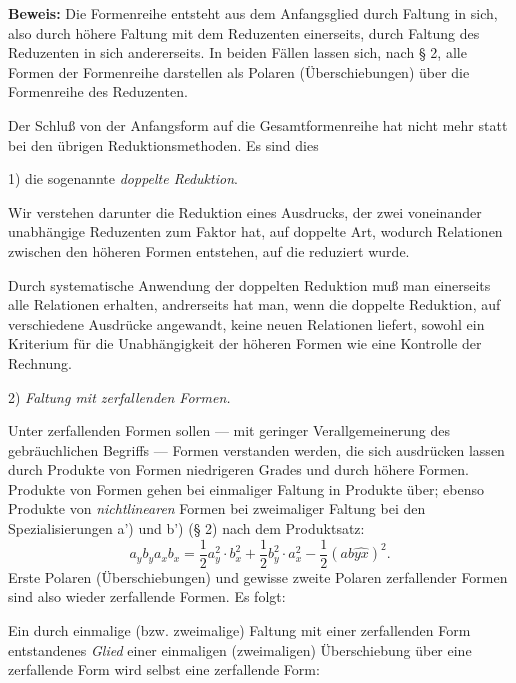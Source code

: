 \textbf{Beweis:} Die Formenreihe entsteht aus dem Anfangsglied durch Faltung in sich, also durch höhere Faltung mit dem Reduzenten einerseits, durch Faltung des Reduzenten in sich andererseits. In beiden Fällen lassen sich, nach § 2, alle Formen der Formenreihe darstellen als Polaren (Überschiebungen) über die Formenreihe des Reduzenten.

Der Schluß von der Anfangsform auf die Gesamtformenreihe hat nicht mehr statt bei den übrigen Reduktionsmethoden. Es sind dies

1) die sogenannte \emph{\glqq{}doppelte Reduktion\grqq{}}.

Wir verstehen darunter die Reduktion eines Ausdrucks, der zwei voneinander unabhängige Reduzenten zum Faktor hat, auf doppelte Art, wodurch Relationen zwischen den höheren Formen entstehen, auf die reduziert wurde.

Durch systematische Anwendung der \glqq{}doppelten Reduktion\grqq{} muß man einerseits alle Relationen erhalten, andrerseits hat man, wenn die \glqq{}doppelte Reduktion\grqq{}, auf verschiedene Ausdrücke angewandt, keine neuen Relationen liefert, sowohl ein Kriterium für die Unabhängigkeit der höheren Formen wie eine Kontrolle der Rechnung.

2) \emph{Faltung mit zerfallenden Formen.}

Unter \glqq{}zerfallenden Formen\grqq{} sollen --- mit geringer Verallgemeinerung des gebräuchlichen Begriffs --- Formen verstanden werden, die sich ausdrücken lassen durch Produkte von Formen niedrigeren Grades und durch \glqq{}höhere\grqq{} Formen. Produkte von Formen gehen bei einmaliger Faltung in Produkte über; ebenso Produkte von \emph{nichtlinearen} Formen bei zweimaliger Faltung bei den Spezialisierungen a') und b') (§ 2) nach dem Produktsatz:
\[
a_yb_y a_xb_x=\frac12a_y^2\cdot b_x^2+\frac12b_y^2\cdot a_x^2-\frac12(ab\widehat{yx})^2.
\]
Erste Polaren (Überschiebungen) und gewisse zweite Polaren zerfallender Formen sind also wieder zerfallende Formen. Es folgt:

Ein durch einmalige (bzw. zweimalige) Faltung mit einer zerfallenden Form entstandenes \emph{Glied} einer einmaligen (zweimaligen) Überschiebung über eine zerfallende Form wird selbst eine zerfallende Form:

